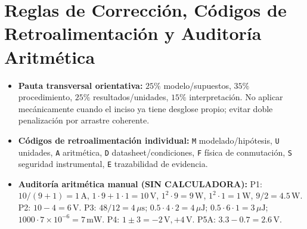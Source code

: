 \documentclass[11pt, a4paper]{article}
\begin{document}
\section*{Reglas de Corrección, Códigos de Retroalimentación y Auditoría Aritmética}
\begin{itemize}[noitemsep, topsep=2pt]
    \item \textbf{Pauta transversal orientativa:} $25\%$ modelo/supuestos, $35\%$ procedimiento, $25\%$ resultados/unidades, $15\%$ interpretación. No aplicar mecánicamente cuando el inciso ya tiene desglose propio; evitar doble penalización por arrastre coherente.
    \item \textbf{Códigos de retroalimentación individual:} \texttt{M} modelado/hipótesis, \texttt{U} unidades, \texttt{A} aritmética, \texttt{D} datasheet/condiciones, \texttt{F} física de conmutación, \texttt{S} seguridad instrumental, \texttt{E} trazabilidad de evidencia.
    \item \textbf{Auditoría aritmética manual (SIN CALCULADORA):} P1: $10/(9+1)=1\,\text{A}$, $1\cdot 9 + 1\cdot 1 = 10\,\text{V}$, $1^2\cdot 9 = 9\,\text{W}$, $1^2\cdot 1 = 1\,\text{W}$, $9/2 = 4.5\,\text{W}$. P2: $10 - 4 = 6\,\text{V}$. P3: $48/12 = 4\,\mu\text{s}$; $0.5\cdot 4\cdot 2 = 4\,\mu\text{J}$; $0.5\cdot 6\cdot 1 = 3\,\mu\text{J}$; $1000\cdot 7\times 10^{-6} = 7\,\text{mW}$. P4: $1 \pm 3 = -2\,\text{V}, +4\,\text{V}$. P5A: $3.3 - 0.7 = 2.6\,\text{V}$.
\end{itemize}
\end{document}
